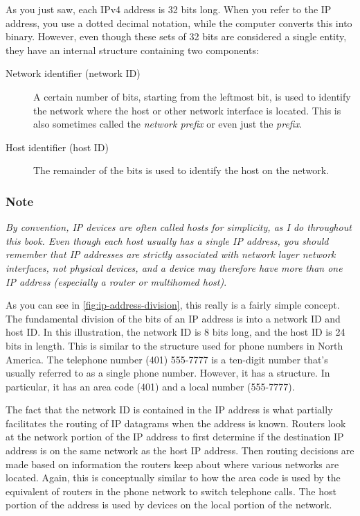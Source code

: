 As you just saw, each IPv4 address is 32 bits long.
When you refer to the IP address, you use a dotted decimal notation, while the computer converts
this into binary. However, even though these sets of 32 bits are
considered a single entity, they have an internal structure containing
two components:
\begin{description}
   \item[Network identifier (network ID)]
      A certain number of bits, starting from the leftmost bit, is used to identify the network where the host or other network interface is located. This is also sometimes called the \emph{network prefix} or even just the \emph{prefix}.
   \item[Host identifier (host ID)]
      The remainder of the bits is used to identify the host on the network.
\end{description}

\subsubsection{Note}

{\emph{By convention, IP devices are often called hosts for simplicity,
as I do throughout this book. Even though each host usually has a single
IP address, you should remember that IP addresses are strictly
associated with network layer network interfaces, not physical devices,
and a device may therefore have more than one IP address (especially a
router or multihomed host)}}.

As you can see in \cref{fig:ip-address-division},
this really is a fairly simple concept. The fundamental division of the
bits of an IP address is into a network ID and host ID. In this
illustration, the network ID is 8 bits long, and the host ID is 24 bits
in length. This is similar to the structure used for phone numbers in
North America. The telephone number (401) 555-7777 is a ten-digit number
that's usually referred to as a single phone number. However, it has a
structure. In particular, it has an area code (401) and a local number
(555-7777).

The fact that the network ID is contained in the IP address is what
partially facilitates the routing of IP datagrams when the address is
known. Routers look at the network portion of the IP address to first
determine if the destination IP address is on the same network as the
host IP address. Then routing decisions are made based on information
the routers keep about where various networks are located. Again, this
is conceptually similar to how the area code is used by the equivalent
of routers in the phone network to switch telephone calls. The host
portion of the address is used by devices on the local portion of the
network.


